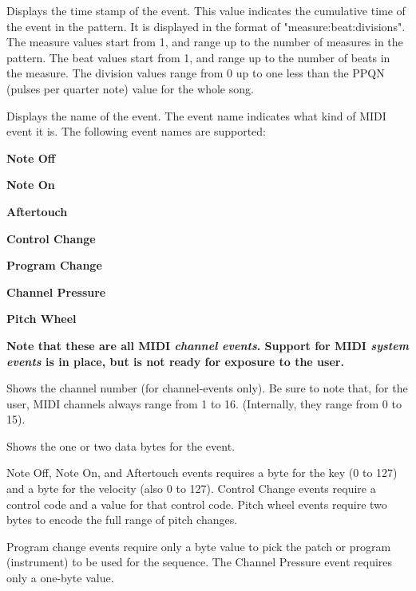    Displays the time stamp of the event.
   This value indicates the cumulative time of the event in the pattern.
   It is displayed in the format of "measure:beat:divisions".
   The measure values start from 1, and range up to the number of measures in
   the pattern.
   The beat values start from 1, and range up to the number of beats in the
   measure.
   The division values range from 0 up to one less than the
   PPQN (pulses per quarter note) value for the whole song.

   Displays the name of the event.
   The event name indicates what kind of MIDI event it is. 
   The following event names are supported:

   \begin{enumber}
      \item \textbf{Note Off}
      \item \textbf{Note On}
      \item \textbf{Aftertouch}
      \item \textbf{Control Change}
      \item \textbf{Program Change}
      \item \textbf{Channel Pressure}
      \item \textbf{Pitch Wheel}
   \end{enumber}

   \textbf{Note that these are all MIDI \textsl{channel events}.
   Support for MIDI \textsl{system events} is in place, but is not
   ready for exposure to the user.}

   Shows the channel number (for channel-events only).
   Be sure to note that, for the user, MIDI channels always range from
   1 to 16.  (Internally, they range from 0 to 15).

   Shows the one or two data bytes for the event.

   Note Off, Note On, and Aftertouch events requires a byte for the key (0 to
   127) and a byte for the velocity (also 0 to 127).
   Control Change events require a control code and a value for that control
   code.  Pitch wheel events require two bytes to encode the full range of
   pitch changes.

   Program change events require only a byte value to pick the patch or program
   (instrument) to be used for the sequence.  The Channel Pressure event
   requires only a one-byte value.

